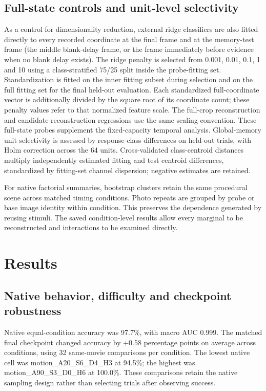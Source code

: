 \documentclass[11pt]{article}
\begin{document}
\subsection{Full-state controls and unit-level selectivity}
As a control for dimensionality reduction, external ridge classifiers are also fitted directly to every recorded coordinate at the final frame and at the memory-test frame (the middle blank-delay frame, or the frame immediately before evidence when no blank delay exists). The ridge penalty is selected from 0.001, 0.01, 0.1, 1 and 10 using a class-stratified 75/25 split inside the probe-fitting set. Standardization is fitted on the inner fitting subset during selection and on the full fitting set for the final held-out evaluation. Each standardized full-coordinate vector is additionally divided by the square root of its coordinate count; these penalty values refer to that normalized feature scale. The full-crop reconstruction and candidate-reconstruction regressions use the same scaling convention. These full-state probes supplement the fixed-capacity temporal analysis. Global-memory unit selectivity is assessed by response-class differences on held-out trials, with Holm correction across the 64 units. Cross-validated class-centroid distances multiply independently estimated fitting and test centroid differences, standardized by fitting-set channel dispersion; negative estimates are retained.

For native factorial summaries, bootstrap clusters retain the same procedural scene across matched timing conditions. Photo repeats are grouped by probe or base image identity within condition. This preserves the dependence generated by reusing stimuli. The saved condition-level results allow every marginal to be reconstructed and interactions to be examined directly.
\section{Results}
\subsection{Native behavior, difficulty and checkpoint robustness}
Native equal-condition accuracy was 97.7\%, with macro AUC 0.999. The matched final checkpoint changed accuracy by +0.58 percentage points on average across conditions, using 32 same-movie comparisons per condition. The lowest native cell was motion\_\allowbreak{}A20\_\allowbreak{}S6\_\allowbreak{}D4\_\allowbreak{}H3 at 94.5\%; the highest was motion\_\allowbreak{}A90\_\allowbreak{}S3\_\allowbreak{}D0\_\allowbreak{}H6 at 100.0\%. These comparisons retain the native sampling design rather than selecting trials after observing success.
\end{document}
